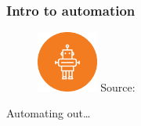 \begin{frame}
  \frametitle{Intro to automation}
  \begin{figure}[htpb]
      \raggedleft
      \includegraphics[width=2cm]{images/robot-icon.eps}
      \newline
      {\tiny Source: \cite{robot_icon}}
  \end{figure}

  Automating out\ldots

\end{frame}
